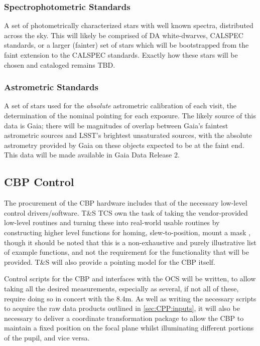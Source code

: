 \subsubsection{Spectrophotometric Standards}\label{sec:CPP:output:spectrophotometricStandards}
A set of photometrically characterized stars with well known spectra, distributed across the sky. This will likely be comprised of DA white-dwarves, CALSPEC standards, or a larger (\ie fainter) set of stars which will be bootstrapped from the faint extension to the CALSPEC standards\cite{2016ApJ...822...67N}.
\alg Exactly how these stars will be chosen and cataloged remains TBD.


\subsubsection{Astrometric Standards}\label{sec:CPP:output:astrometricStandards} 
A set of stars used for the \emph{absolute} astrometric calibration of each visit, \ie the determination of the nominal pointing for each exposure. The likely source of this data is Gaia; there will be  magnitudes of overlap between Gaia's faintest astrometric sources and LSST's brightest unsaturated sources, with the absolute astrometry provided by Gaia on these objects expected to be \microarcsec at the faint end. This data will be made available in Gaia Data Release 2.




\subsection{CBP Control}\label{sec:CPP:CBP_control}
The procurement of the CBP hardware includes that of the necessary low-level control drivers/software. T\&S TCS own the task of taking the vendor-provided low-level routines and turning these into real-world usable routines by constructing higher level functions for \eg homing, slew-to-position, mount a mask \etc, though it should be noted that this is a non-exhaustive and purely illustrative list of example functions, and not the requirement for the functionality that will be provided. T\&S will also provide a pointing model for the CBP itself.

Control scripts for the CBP and interfaces with the OCS will be written, to allow taking all the desired measurements, especially as several, if not all of these, require doing so in concert with the 8.4m. As well as writing the necessary scripts to acquire the raw data products outlined in \secsymbol\ref{sec:CPP:inputs}, it will also be necessary to deliver a coordinate transformation package to allow the CBP to maintain a fixed position on the focal plane whilst illuminating different portions of the pupil, and vice versa.








